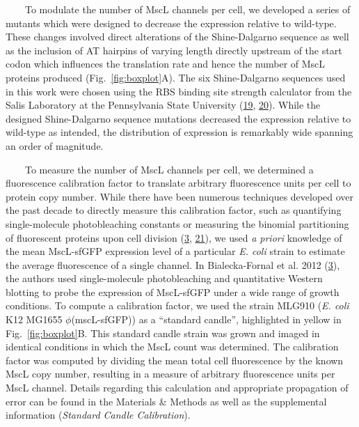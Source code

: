 ~~~~To
modulate
the
number
of
MscL
channels
per
cell,
we
developed
a
series
of
mutants
which
were
designed
to
decrease
the
expression
relative
to
wild-type.
These
changes
involved
direct
alterations
of the
Shine-Dalgarno
sequence
as
well
as the
inclusion
of AT
hairpins
of
varying
length
directly
upstream
of the
start
codon
which
influences
the
translation
rate
and
hence
the
number
of
MscL
proteins
produced
(Fig.~\ref{fig:boxplot}A).
The
six
Shine-Dalgarno
sequences
used
in
this
work
were
chosen
using
the
RBS
binding
site
strength
calculator
from
the
Salis
Laboratory
at the
Pennsylvania
State
University
(\protect\hyperlink{ref-espahborujeni2014}{19},
\protect\hyperlink{ref-salis2009}{20}).
While
the
designed
Shine-Dalgarno
sequence
mutations
decreased
the
expression
relative
to
wild-type
as
intended,
the
distribution
of
expression
is
remarkably
wide
spanning
an
order
of
magnitude.

~~~~To
measure
the
number
of
MscL
channels
per
cell,
we
determined
a
fluorescence
calibration
factor
to
translate
arbitrary
fluorescence
units
per
cell
to
protein
copy
number.
While
there
have
been
numerous
techniques
developed
over
the
past
decade
to
directly
measure
this
calibration
factor,
such
as
quantifying
single-molecule
photobleaching
constants
or
measuring
the
binomial
partitioning
of
fluorescent
proteins
upon
cell
division
(\protect\hyperlink{ref-bialecka-fornal2012}{3},
\protect\hyperlink{ref-elowitz2002}{21}),
we
used
\emph{a
priori}
knowledge
of the
mean
MscL-sfGFP
expression
level
of a
particular
\emph{E.
coli}
strain
to
estimate
the
average
fluorescence
of a
single
channel.
In
Bialecka-Fornal
et al.
2012
(\protect\hyperlink{ref-bialecka-fornal2012}{3}),
the
authors
used
single-molecule
photobleaching
and
quantitative
Western
blotting
to
probe
the
expression
of
MscL-sfGFP
under
a wide
range
of
growth
conditions.
To
compute
a
calibration
factor,
we
used
the
strain
MLG910
(\emph{E.
coli}
K12
MG1655
\(\phi\)(mscL-sfGFP))
as a
``standard
candle'',
highlighted
in
yellow
in
Fig.~\ref{fig:boxplot}B.
This
standard
candle
strain
was
grown
and
imaged
in
identical
conditions
in
which
the
MscL
count
was
determined.
The
calibration
factor
was
computed
by
dividing
the
mean
total
cell
fluorescence
by the
known
MscL
copy
number,
resulting
in a
measure
of
arbitrary
fluorescence
units
per
MscL
channel.
Details
regarding
this
calculation
and
appropriate
propagation
of
error
can be
found
in the
Materials
\&
Methods
as
well
as the
supplemental
information
(\emph{Standard
Candle
Calibration}).

